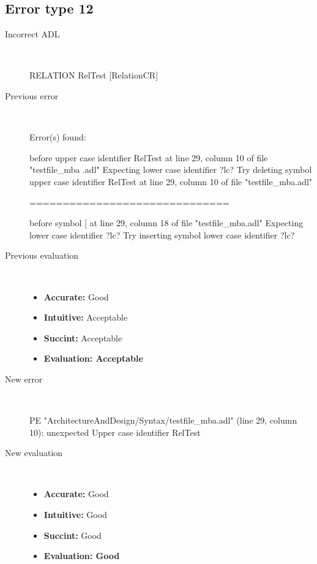 \hrulefill

\subsection{Error type 12}
  \begin{description}
  \item[Incorrect ADL]~\\
\begin{adl}
RELATION RelTest [RelationCR]\end{adl}
  \item[Previous error]~\\
\begin{haskell}
Error(s) found:

before upper case identifier RelTest at line 29, column 10 of file "testfile_mba
.adl"
Expecting lower case identifier ?lc?
Try deleting symbol upper case identifier RelTest at line 29, column 10 of file
"testfile_mba.adl"

==============================

before symbol [ at line 29, column 18 of file "testfile_mba.adl"
Expecting lower case identifier ?lc?
Try inserting symbol lower case identifier ?lc?\end{haskell}
  \item[Previous evaluation]~\\
    \begin{itemize}
    \item \textbf{Accurate:} Good
    \item \textbf{Intuitive:} Acceptable
    \item \textbf{Succint:} Acceptable
    \item \textbf{Evaluation: Acceptable}
    \end{itemize}
  \item[New error]~\\
\begin{haskell}
PE "ArchitectureAndDesign/Syntax/testfile_mba.adl" (line 29, column 10):
unexpected Upper case identifier RelTest\end{haskell}
  \item[New evaluation]~\\
    \begin{itemize}
    \item \textbf{Accurate:} Good
    \item \textbf{Intuitive:} Good
    \item \textbf{Succint:} Good
    \item \textbf{Evaluation: Good
}
    \end{itemize}
  \end{description}

